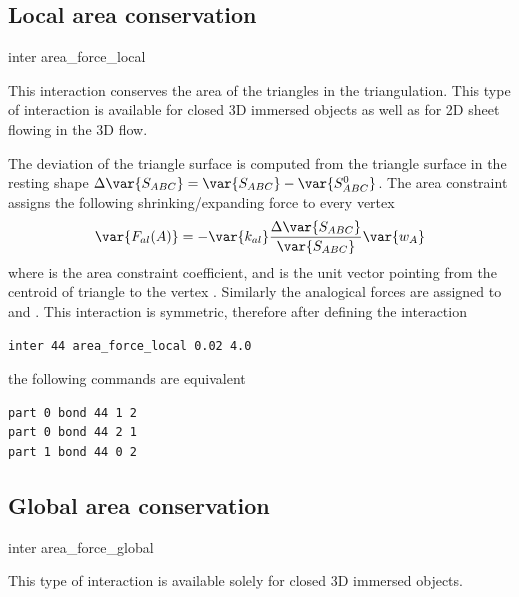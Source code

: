 \subsection{Local area conservation}

\begin{essyntax}
  inter 
  area_force_local
   
\end{essyntax}
This interaction conserves the area of the triangles in the triangulation. This 
type of interaction is available for closed 3D immersed objects as well as for 2D 
sheet flowing in the 3D flow.

The deviation of the triangle surface  is computed from the triangle 
surface in the resting shape $\Delta \var{S_{ABC}} = \var{S_{ABC}} - \var{S_{ABC}^0}$. 
The area constraint assigns the following  shrinking/expanding force to every vertex 
\begin{equation}
 \var{F_{al}(A)} = -\var{k_{al}}\frac{\Delta \var{S_{ABC}}}{\var{S_{ABC}}}\var{w_{A}}
\end{equation}
where   is the area constraint coefficient, and  is the unit 
vector pointing from the centroid of triangle  to the vertex . 
Similarly the analogical forces are assigned to  and . This interaction 
is symmetric, therefore after defining the interaction
\begin{verbatim} 
inter 44 area_force_local 0.02 4.0
\end{verbatim}
the following commands are equivalent
\begin{verbatim} 
part 0 bond 44 1 2
part 0 bond 44 2 1
part 1 bond 44 0 2
\end{verbatim}

\subsection{Global area conservation}

\begin{essyntax}
  inter 
  area_force_global
   
\end{essyntax}
This type of interaction is available solely for closed 3D immersed objects.

